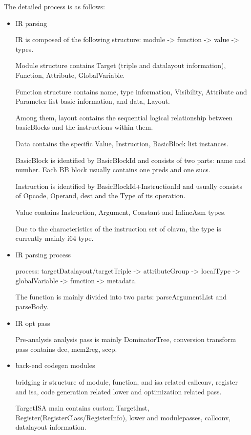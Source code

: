The detailed process is as follows:
    \begin{itemize}
        \item IR parsing

    IR is composed of the following structure: module -> function -> value -> types.

    Module structure contains Target (triple and datalayout information), Function, Attribute, GlobalVariable.

    Function structure contains name, type information, Visibility, Attribute and Parameter list basic information, and data, Layout.

    Among them, layout contains the sequential logical relationship between basicBlocks and the instructions within them.

    Data contains the specific Value, Instruction, BasicBlock list instances.

    BasicBlock is identified by BasicBlockId and consists of two parts: name and number. Each BB block usually contains one preds and one sucs.

    Instruction is identified by BasicBlockId+InstructionId and usually consists of Opcode, Operand, dest and the Type of its operation.

    Value contains Instruction, Argument, Constant and InlineAsm types.

    Due to the characteristics of the instruction set of olavm, the type is currently mainly i64 type.

        \item IR parsing process

        process: targetDatalayout/targetTriple -> attributeGroup -> localType -> globalVariable -> function -> metadata.

    The function is mainly divided into two parts: parseArgumentList and parseBody.

        \item IR opt pass

    Pre-analysis analysis pass is mainly DominatorTree, conversion transform pass contains dce, mem2reg, sccp.

        \item back-end codegen modules

    bridging ir structure of module, function, and isa related callconv, register and isa, code generation related lower and optimization related pass.

    TargetISA main contains custom TargetInst, Register(RegisterClass/RegisterInfo), lower and modulepasses, callconv, datalayout information.


\end{itemize}
